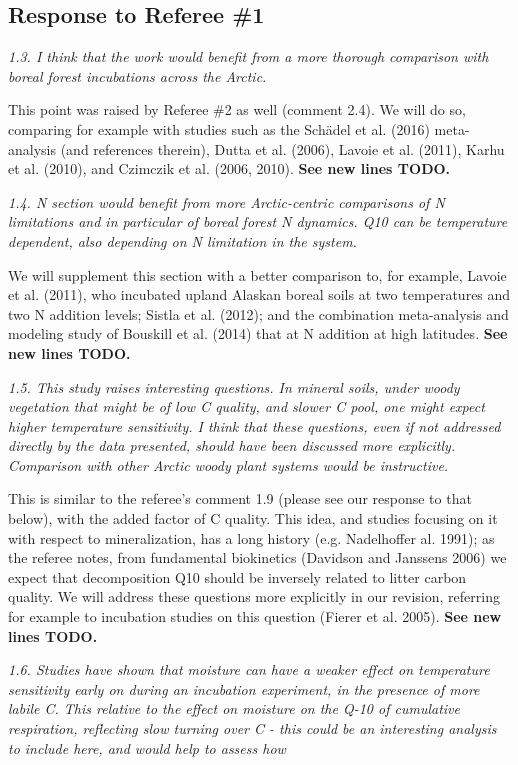 \documentclass[11pt, oneside]{article}
\begin{document}
\subsection*{Response to Referee \#1}

{\it 1.3. I think that the work would benefit from a more thorough comparison with boreal forest incubations across the Arctic. }

This point was raised by Referee \#2 as well (comment 2.4). We will do so, comparing for example with studies such as the Schädel et al. (2016) meta-analysis (and references therein), Dutta et al. (2006), Lavoie et al. (2011), Karhu et al. (2010), and Czimczik et al. (2006, 2010). {\bf See new lines TODO.}

\medskip
{\it 1.4. N section would benefit from more Arctic-centric comparisons of N limitations and in particular of boreal forest N dynamics. Q10 can be temperature dependent, also depending on N limitation in the system. }

We will supplement this section with a better comparison to, for example, Lavoie et al. (2011), who incubated upland Alaskan boreal soils at two temperatures and two N addition levels; Sistla et al. (2012); and the combination meta-analysis and modeling study of Bouskill et al. (2014) that at N addition at high latitudes. {\bf See new lines TODO.}

\medskip
{\it 1.5. This study raises interesting questions. In mineral soils, under woody vegetation that might be of low C quality, and slower C pool, one might expect higher temperature sensitivity. I think that these questions, even if not addressed directly by the data presented, should have been discussed more explicitly. Comparison with other Arctic woody plant systems would be instructive. }

This is similar to the referee's comment 1.9 (please see our response to that below), with the added factor of C quality. This idea, and studies focusing on it with respect to mineralization, has a long history (e.g. Nadelhoffer al. 1991); as the referee notes, from fundamental biokinetics (Davidson and Janssens 2006) we expect that decomposition Q10 should be inversely related to litter carbon quality. We will address these questions more explicitly in our revision, referring for example to incubation studies on this question (Fierer et al. 2005). {\bf See new lines TODO.}

\medskip
{\it 1.6. Studies have shown that moisture can have a weaker effect on temperature sensitivity early on during an incubation experiment, in the presence of more labile C. This relative to the effect on moisture on the Q-10 of cumulative respiration, reflecting slow turning over C - this could be an interesting analysis to include here, and would help to assess how }
\end{document}
